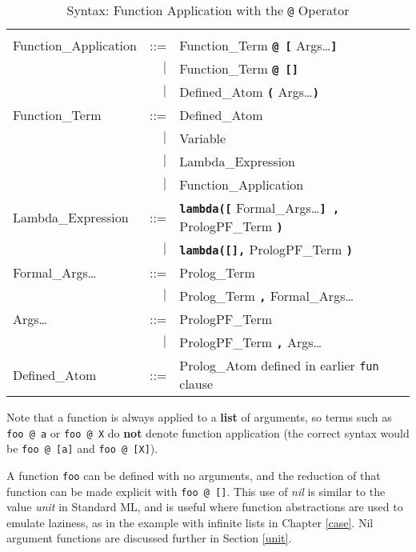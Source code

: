 \begin{table}[htbp]
{\small
\begin{tabular}{| l r l |}
\hline
 & & \\[2mm]
Function\_{}Application & ::= & Function\_{}Term \texttt{\textbf{@ [}} Args\ldots \texttt{\textbf{]}}\\
 & $|$ & Function\_{}Term \texttt{\textbf{@ []}}\\
 & $|$ & Defined\_{}Atom \texttt{\textbf{(}} Args\ldots \texttt{\textbf{)}}\\[4mm]
Function\_{}Term & ::= & Defined\_{}Atom\\
 & $|$ & Variable\\
 & $|$ & Lambda\_{}Expression\\
 & $|$ & Function\_{}Application\\[4mm]
Lambda\_{}Expression & ::= & \texttt{\textbf{lambda([}} Formal\_{}Args\ldots \texttt{\textbf{] ,}}
                                PrologPF\_{}Term \texttt{\textbf{)}}\\
 & $|$ & \texttt{\textbf{lambda([],}} PrologPF\_{}Term \texttt{\textbf{)}}\\[4mm]
Formal\_{}Args\ldots & ::= & Prolog\_{}Term\\
 & $|$ & Prolog\_{}Term \texttt{\textbf{,}} Formal\_{}Args\ldots\\[4mm]
Args\ldots & ::= & PrologPF\_{}Term\\
 & $|$ & PrologPF\_{}Term \texttt{\textbf{,}} Args\ldots\\[4mm]
Defined\_{}Atom & ::= & Prolog\_{}Atom defined in earlier \texttt{fun} clause\\
\hline
\end{tabular}
}
\caption{Syntax: Function Application with the \texttt{@} Operator}
\label{syntax:application}
\end{table}

Note that a function is always applied to a \textbf{list} of arguments,
so terms such as
\texttt{foo @ a} or \texttt{foo @ X}
do \textbf{not} denote function application (the correct syntax would be
\texttt{foo @ [a]} and \texttt{foo @ [X]}).

A function \texttt{foo} can be
defined with no arguments, and the reduction of that function can be made
explicit with \texttt{foo @ []}.  This use of \textit{nil} is similar to
the value \textit{unit} in Standard ML, and is useful where function
abstractions are used to emulate laziness, as in the example with infinite
lists in Chapter \ref{case}.  Nil argument functions are
discussed further in Section \ref{unit}.

